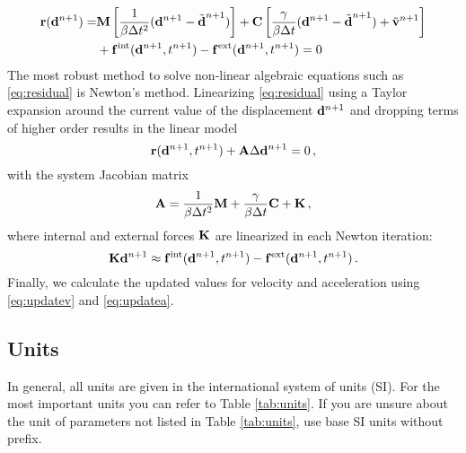 \begin{align}
     \vec r(\dn{n+1}) =& \M \left[ \frac{1}{\beta \dt^2} (\dn{n+1} - \dnp{n+1}) \right]
        + \C \left[ \frac{\gamma}{\beta \dt} (\dn{n+1} - \dnp{n+1}) + \vnp{n+1} \right] \nonumber \\
        &+ \vec f^\mathrm{int}(\dn{n+1}, \tn{n+1}) - \vec f^\mathrm{ext}(\dn{n+1}, \tn{n+1}) = 0 \label{eq:residual}
\end{align}
The most robust method to solve non-linear algebraic equations such as \autoref{eq:residual} is Newton's method.
Linearizing \autoref{eq:residual} using a Taylor expansion around the current value of the displacement $\dn{n+1}$ and dropping terms of higher order results in the linear model
\begin{equation}
    \vec r(\dn{n+1}, \tn{n+1}) + \vec A \Delta \dn{n+1} = 0 \,, \label{eq:linMech}
\end{equation}
with the system Jacobian matrix
\begin{equation}
    \vec A = \frac{1}{\beta \dt^2} \M + \frac{\gamma}{\beta \dt} \C + \K \,,
\end{equation}
where internal and external forces $\K$ are linearized in each Newton iteration:
\begin{equation}
    \K \dn{n+1} \approx \vec f^\mathrm{int}(\dn{n+1}, \tn{n+1}) - \vec f^\mathrm{ext}(\dn{n+1}, \tn{n+1}) \,.
\end{equation}
Finally, we calculate the updated values for velocity and acceleration using \autoref{eq:updatev} and \autoref{eq:updatea}.


\subsection{Units}

In general, all units are given in the international system of units (SI).
For the most important units you can refer to Table \ref{tab:units}.
If you are unsure about the unit of parameters not listed in Table \ref{tab:units}, use base SI units without prefix.

